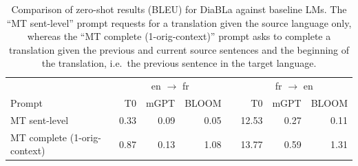 \begin{table}[ht!]
    \centering\small
    \begin{tabular}{lrrrcrrr}
    \toprule
    & \multicolumn{3}{c}{en $\rightarrow$ fr } & \hphantom{woo} & \multicolumn{3}{c}{fr $\rightarrow$ en } \\
    Prompt & T0 & mGPT & BLOOM && T0 & mGPT & BLOOM  \\ 
    \midrule
    MT sent-level       & 0.33 & 0.09 & 0.05 && 12.53 & 0.27 & 0.11 \\
    MT complete (1-orig-context) & 0.87 & 0.13 & 1.08 && 13.77 & 0.59 & 1.31 \\ 
    \bottomrule
    \end{tabular}
    \caption{Comparison of zero-shot results (BLEU) for DiaBLa against baseline LMs. The ``MT sent-level'' prompt requests for a translation given the source language only, whereas the ``MT complete (1-orig-context)'' prompt asks to complete a translation given the previous and current source sentences and the beginning of the translation, i.e.~the previous sentence in the target language.}
    \label{tab:mt-diabla-zero-shot-compare-baselines}
\end{table}